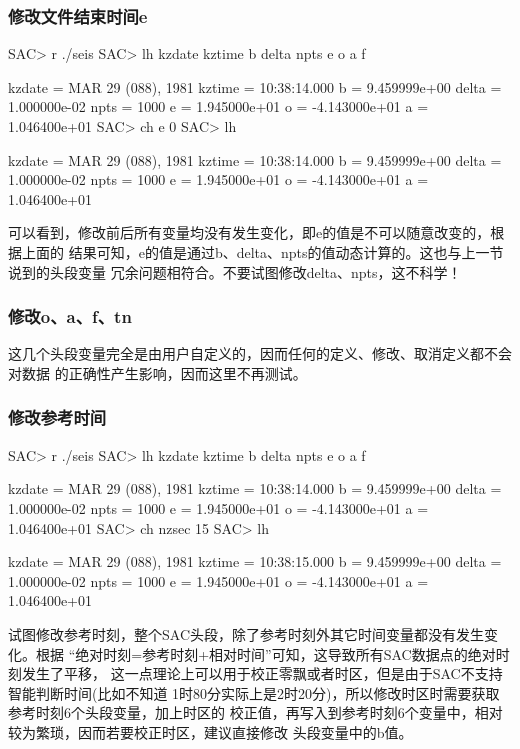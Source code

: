 \subsubsection{修改文件结束时间e}
\begin{SACCode}
SAC> r ./seis
SAC> lh kzdate kztime b delta npts e o a f

     kzdate = MAR 29 (088), 1981
     kztime = 10:38:14.000
          b = 9.459999e+00
      delta = 1.000000e-02
       npts = 1000
          e = 1.945000e+01
          o = -4.143000e+01
          a = 1.046400e+01
SAC> ch e 0
SAC> lh

     kzdate = MAR 29 (088), 1981
     kztime = 10:38:14.000
          b = 9.459999e+00
      delta = 1.000000e-02
       npts = 1000
          e = 1.945000e+01
          o = -4.143000e+01
          a = 1.046400e+01
\end{SACCode}

可以看到，修改前后所有变量均没有发生变化，即e的值是不可以随意改变的，根据上面的
结果可知，e的值是通过b、delta、npts的值动态计算的。这也与上一节说到的头段变量
冗余问题相符合。不要试图修改delta、npts，这不科学！

\subsubsection{修改o、a、f、tn}
这几个头段变量完全是由用户自定义的，因而任何的定义、修改、取消定义都不会对数据
的正确性产生影响，因而这里不再测试。

\subsubsection{修改参考时间}
\begin{SACCode}
SAC> r ./seis
SAC> lh kzdate kztime b delta npts e o a f

     kzdate = MAR 29 (088), 1981
     kztime = 10:38:14.000
          b = 9.459999e+00
      delta = 1.000000e-02
       npts = 1000
          e = 1.945000e+01
          o = -4.143000e+01
          a = 1.046400e+01
SAC> ch nzsec 15
SAC> lh

     kzdate = MAR 29 (088), 1981
     kztime = 10:38:15.000
          b = 9.459999e+00
      delta = 1.000000e-02
       npts = 1000
          e = 1.945000e+01
          o = -4.143000e+01
          a = 1.046400e+01
\end{SACCode}

试图修改参考时刻，整个SAC头段，除了参考时刻外其它时间变量都没有发生变化。根据
``绝对时刻=参考时刻+相对时间''可知，这导致所有SAC数据点的绝对时刻发生了平移，
这一点理论上可以用于校正零飘或者时区，但是由于SAC不支持智能判断时间(比如不知道
1时80分实际上是2时20分)，所以修改时区时需要获取参考时刻6个头段变量，加上时区的
校正值，再写入到参考时刻6个变量中，相对较为繁琐，因而若要校正时区，建议直接修改
头段变量中的b值。

